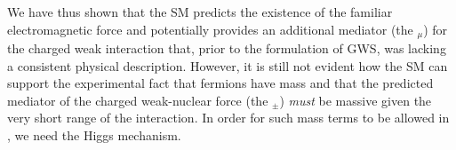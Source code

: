 We have thus shown that the SM predicts the existence of the familiar electromagnetic force
and potentially provides an additional mediator (the \fieldWpm$_{\mu}$) for the charged weak interaction that, prior to the
formulation of GWS, was lacking a consistent physical description. However, it is still
not evident how the SM can support the experimental fact that fermions have mass and that
the predicted mediator of the charged weak-nuclear force (the \fieldWpm$_{\pm}$) \textit{must}
be massive given the very short range of the interaction. In order for such mass terms to
be allowed in \SML, we need the Higgs mechanism.

%
%
%
%

